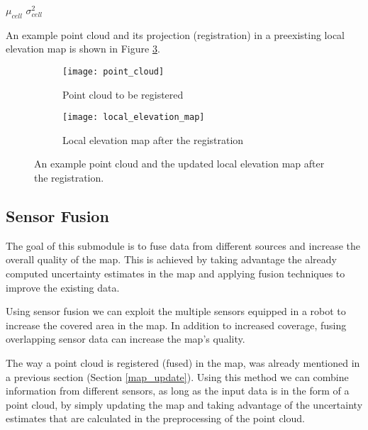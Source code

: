 \begin{itemize}
\begin{algorithm}
\begin{algorithmic}[1]
                     {$\mu_{cell}$}
                     {$\sigma^2_{cell}$}
                \EndFor
            \end{algorithmic}
        \end{algorithm}

        An example point cloud and its projection (registration) in a
        preexisting local elevation map is shown in Figure
        \ref{fig:point_cloud_registration}.

        \begin{figure}[t]
            \centering
            \begin{subfigure}{0.5\textwidth}
                \centering
                \texttt{[image: point\_cloud]}
                \caption{Point cloud to be registered}
                \label{fig:point_cloud}
            \end{subfigure}
            \begin{subfigure}{0.5\textwidth}
                \centering
                \texttt{[image: local\_elevation\_map]}
                \caption{Local elevation map after the registration}
                \label{fig:local_elevation_map}
            \end{subfigure}
            \caption[Point cloud registration in the local elevation map]{
                An example point cloud and the updated
                local elevation map after the registration.}
            \label{fig:point_cloud_registration}
        \end{figure}
\end{itemize}

\subsection{Sensor Fusion}

The goal of this submodule is to fuse data from different sources and
increase the overall quality of the map.
This is achieved by taking advantage the already computed uncertainty
estimates in the map and applying fusion techniques to improve the
existing data.

Using sensor fusion we can exploit the multiple sensors equipped in
a robot to increase the covered area in the map.
In addition to increased coverage, fusing overlapping sensor data can
increase the map's quality.

The way a point cloud is registered (fused) in the map, was already mentioned
in a previous section (Section \ref{map_update}).
Using this method we can combine information from different sensors, as long
as the input data is in the form of a point cloud, by simply updating the map
and taking advantage of the uncertainty estimates that are calculated
in the preprocessing of the point cloud.

